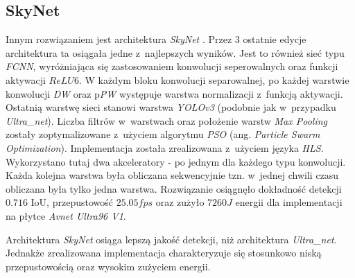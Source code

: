 \subsection{SkyNet}
Innym rozwiązaniem jest architektura \emph{SkyNet} \cite{skynet}. 
Przez 3 ostatnie edycje architektura ta osiągała jedne z~najlepszych wyników.
Jest to również sieć typu \emph{FCNN}, wyróżniająca się zastosowaniem konwolucji seperowalnych oraz funkcji aktywacji $ReLU6$.
W każdym bloku konwolucji separowalnej, po każdej warstwie konwolucji \emph{DW} oraz p\emph{PW}  występuje warstwa normalizacji z~funkcją aktywacji.
Ostatnią warstwę sieci stanowi warstwa \emph{YOLOv3} (podobnie jak w~przypadku \emph{Ultra\_net}).
Liczba filtrów w~warstwach oraz położenie warstw \textit{Max Pooling} zostały zoptymalizowane z~użyciem algorytmu \emph{PSO} (ang. \emph{Particle Swarm Optimization}).
Implementacja została zrealizowana z~użyciem języka \emph{HLS}.
Wykorzystano tutaj dwa akceleratory - po jednym dla każdego typu konwolucji.
Każda kolejna warstwa była obliczana sekwencyjnie tzn. w~jednej chwili czasu obliczana była tylko jedna warstwa.  
Rozwiązanie osiągnęło dokładność detekcji $0.716$ IoU, przepustowość $25.05 fps$ oraz zużyło $7260 J$ energii dla implementacji na płytce \emph{Avnet Ultra96 V1}. 

Architektura \emph{SkyNet} osiąga lepszą jakość detekcji, niż architektura \emph{Ultra\_net}. 
Jednakże zrealizowana implementacja charakteryzuje się stosunkowo niską przepustowością oraz wysokim zużyciem energii.



